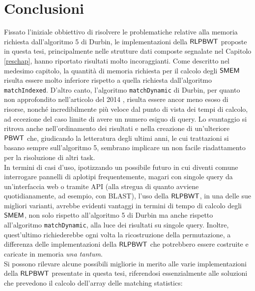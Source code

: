 \documentclass[a4paper,12pt, oneside]{book}
\newcommand{\dc}[1]{\todo[backgroundcolor=yellow]{\textbf{DC} #1}}
\def\PBWT{\mbox{\rm {\sf PBWT}}}
\def\RLPBWT{\mbox{\rm {\sf RLPBWT}}}
\def\SMEM{\mbox{\rm {\sf SMEM}}}
\begin{document}
\chapter{Conclusioni}
\label{conchap}
Fissato l'iniziale obbiettivo di risolvere le problematiche relative alla
memoria richiesta dall'algoritmo 5 di Durbin, le implementazioni della
$\RLPBWT$ proposte in questa tesi, principalmente nelle strutture dati composte
segnalate nel 
Capitolo \ref{reschap}, hanno riportato risultati molto incoraggianti. Come
descritto nel medesimo capitolo, la quantità di memoria richiesta per il calcolo
degli $\SMEM$ risulta essere 
molto inferiore rispetto a quella richiesta dall'algoritmo
\texttt{matchIndexed}. D'altro canto, l'algoritmo \texttt{matchDynamic} di 
Durbin, per quanto non approfondito nell'articolo del 2014 \cite{pbwt}, risulta
essere ancor meno esoso di risorse, nonché incredibilmente più veloce dal punto
di vista dei tempi di calcolo, ad eccezione del caso limite di avere un numero
esiguo di query. Lo svantaggio si ritrova anche nell'ordinamento dei risultati
e nella creazione di un'ulteriore $\PBWT$
che, giudicando la letteratura degli ultimi anni, le cui trattazioni si basano
sempre sull'algoritmo 5, sembrano implicare un non facile 
riadattamento per la risoluzione di altri task.\\
In termini di casi d'uso, ipotizzando un possibile futuro in cui diventi comune
interrogare pannelli di aplotipi frequentemente, magari con singole query da
un'interfaccia web o tramite API (alla stregua di quanto avviene
quotidianamente, ad esempio, con BLAST), l'uso della $\RLPBWT$, in una delle sue
migliori varianti, avrebbe evidenti vantaggi in termini di tempo di calcolo
degli $\SMEM$, non solo
rispetto all'algoritmo 5 di Durbin ma anche rispetto all'algoritmo
\texttt{matchDynamic}, 
alla luce dei risultati su singole query. Inoltre, quest'ultimo richiederebbe
ogni volta la ricostruzione della permutazione, a differenza delle
implementazioni della $\RLPBWT$ che potrebbero essere costruite e caricate in
memoria \textit{una tantum}.\\
\dc{Frase da rivedere}
Si possono rilevare alcune possibili migliorie in merito
alle varie implementazioni della $\RLPBWT$ presentate in questa tesi,
riferendosi essenzialmente alle soluzioni che prevedono il calcolo
dell'array delle matching statistics: 
\end{document}
